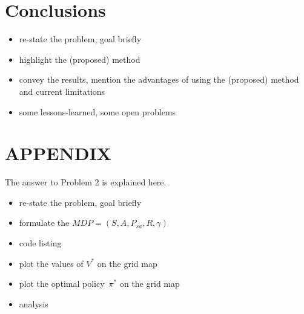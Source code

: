 \documentclass[letterpaper, 10 pt, conference]{ieeeconf}  %
\begin{document}
\section{Conclusions}
\begin{itemize}
    \item re-state the problem, goal briefly
    \item highlight the (proposed) method
    \item convey the results, mention the advantages of using the (proposed) method and current limitations
    \item some lessons-learned, some open problems
\end{itemize}

\section*{APPENDIX}
The answer to Problem 2 is explained here.
\begin{itemize}
    \item re-state the problem, goal briefly
    \item formulate the $MDP=(S, A, P_{sa}, R, \gamma)$
    \item code listing
    \item plot the values of $V^*$ on the grid map
    \item plot the optimal policy~$\pi^*$ on the grid map
    \item analysis
\end{itemize}



\end{document}
